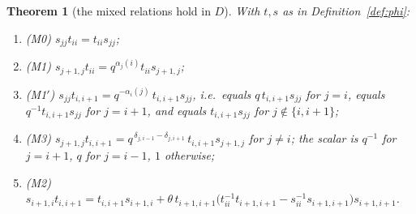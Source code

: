 \documentclass[11pt]{article}
\newtheorem{theorem}{Theorem}[section]
\theoremstyle{definition}
\theoremstyle{remark}
\newcommand{\tht}{\theta}
\begin{document}
\begin{theorem}[the mixed relations hold in $D$]\label{thm:mixed}
With $t,s$ as in Definition~\ref{def:phi}:
\begin{enumerate}[label=(\alph*),leftmargin=2.2em]
\item (M0) $s_{jj}t_{ii}=t_{ii}s_{jj}$;
\item (M1) $s_{j+1,j}t_{ii}=q^{\alpha_j(i)}t_{ii}s_{j+1,j}$;
\item (M1$'$) $s_{jj}t_{i,i+1}=q^{-\alpha_i(j)}\,t_{i,i+1}s_{jj}$,
  i.e.\ equals $q\,t_{i,i+1}s_{jj}$ for $j=i$, equals
  $q^{-1}t_{i,i+1}s_{jj}$ for $j=i+1$, and equals $t_{i,i+1}s_{jj}$
  for $j\notin\{i,i+1\}$;
\item (M3)
  $s_{j+1,j}t_{i,i+1}=q^{\,\delta_{j,i-1}-\delta_{j,i+1}}\,
  t_{i,i+1}s_{j+1,j}$ for $j\ne i$; the scalar is $q^{-1}$ for
  $j=i+1$, $q$ for $j=i-1$, $1$ otherwise;
\item (M2) $s_{i+1,i}t_{i,i+1}
  =t_{i,i+1}s_{i+1,i}
  +\tht\,t_{i+1,i+1}\bigl(t_{ii}^{-1}t_{i+1,i+1}
      -s_{ii}^{-1}s_{i+1,i+1}\bigr)s_{i+1,i+1}$.
\end{enumerate}
\end{theorem}
\end{document}
